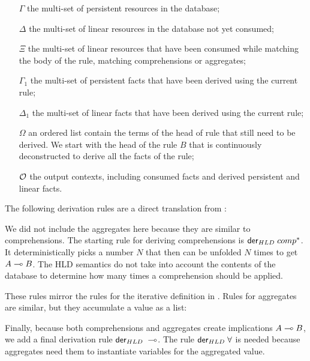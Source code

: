 \begin{enumerate}

   \item[$\Gamma$] the multi-set of persistent resources in the database;

   \item[$\Delta$] the multi-set of linear resources in the database not yet
   consumed;

   \item[$\Xi$] the multi-set of linear resources that have been consumed while
   matching the body of the rule, matching comprehensions or aggregates;

   \item[$\Gamma_1$] the multi-set of persistent facts that have been derived
   using the current rule;

   \item[$\Delta_1$] the multi-set of linear facts that have been derived using
   the current rule;

   \item[$\Omega$] an ordered list contain the terms of the head of rule that
   still need to be derived. We start with the head of the rule $B$ that is
   continuously deconstructed to derive all the facts of the rule;

   \item[$\mathcal{O}$] the output contexts, including consumed facts and derived
   persistent and linear facts.

\end{enumerate}

The following derivation rules are a direct translation from \fragment:



We did not include the aggregates here because they are similar to comprehensions.
The starting rule for deriving comprehensions is $\mathsf{der}_{HLD} \; comp^*$. It
deterministically picks a number $N$ that then can be unfolded $N$ times to get
$A \multimap B$. The HLD semantics do not take into account the contents of the
database to determine how many times a comprehension should be applied.



These rules mirror the rules for the iterative definition in \fragment.  Rules
for aggregates are similar, but they accumulate a value as a list:



Finally, because both comprehensions and aggregates create implications $A \multimap
B$, we add a final derivation rule $\mathsf{der}_{HLD} \; \multimap$. The rule $\mathsf{der}_{HLD} \; \forall$ is
needed because aggregates need them to instantiate variables for the aggregated
value.


